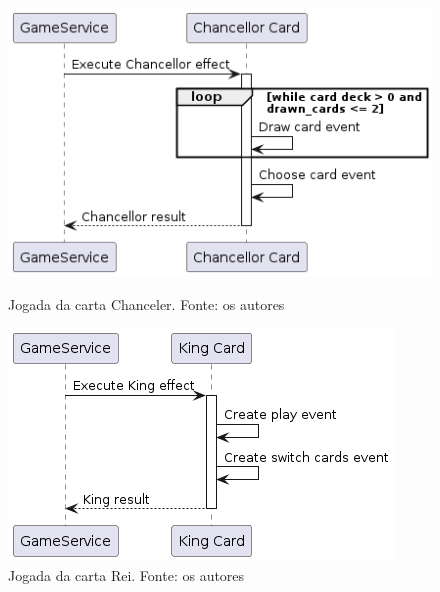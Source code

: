 \begin{figure}[h]
    \centering
    \begin{minipage}{0.48\textwidth}
        \centering
        \includegraphics[width=\textwidth]{diagrams/ChancellorCardPlay.png}
        \caption{Jogada da carta Chanceler. Fonte: os autores}
        \label{fig:chancellor-card-play}
    \end{minipage}
    \hfill
    \begin{minipage}{0.48\textwidth}
        \centering
        \includegraphics[width=\textwidth]{diagrams/KingCardPlay.png}
        \caption{Jogada da carta Rei. Fonte: os autores}
        \label{fig:king-card-play}
    \end{minipage}
\end{figure}

